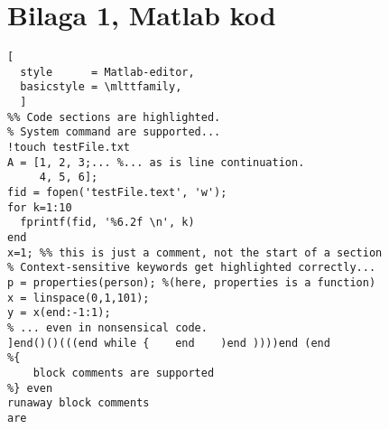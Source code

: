 \section*{Bilaga 1, Matlab kod}

\UseRawInputEncoding
\begin{lstlisting}[
  style      = Matlab-editor,
  basicstyle = \mlttfamily,
  ]
%% Code sections are highlighted.
% System command are supported...
!touch testFile.txt
A = [1, 2, 3;... %... as is line continuation.
     4, 5, 6];
fid = fopen('testFile.text', 'w');
for k=1:10
  fprintf(fid, '%6.2f \n', k)
end
x=1; %% this is just a comment, not the start of a section
% Context-sensitive keywords get highlighted correctly...
p = properties(person); %(here, properties is a function)
x = linspace(0,1,101);
y = x(end:-1:1);
% ... even in nonsensical code.
]end()()(((end while {    end    )end ))))end (end
%{
    block comments are supported
%} even
runaway block comments
are
\end{lstlisting}

%
